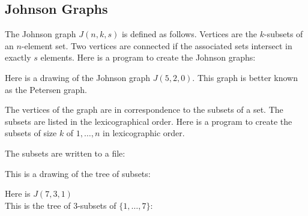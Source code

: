 \subsection{Johnson Graphs}

The Johnson graph $J(n,k,s)$ is defined as follows. Vertices are the $k$-subsets of an $n$-element set. 
Two vertices are connected if the associated sets intersect in exactly $s$ elements. 
Here is a program to create the Johnson graphs:

{\small
{\tt

}
}


Here is a drawing of the Johnson graph $J(5,2,0).$ 
This graph is better known as the Petersen graph.
$$

$$


The vertices of the graph are in correspondence to the subsets of a set. 
The subsets are 
listed in the lexicographical order. 
Here is a program to create the subsets of size $k$ of $1,\ldots,n$ 
in lexicographic order. 

{\small
{\tt

}
}
The subsets are written to a file:
{\small
{\tt

}
}
This is a drawing of the tree of subsets:
$$

$$

Here is $J(7,3,1)$
$$

$$
This is the tree of $3$-subsets of $\{1,\ldots,7\}$:
{\tiny
$$

$$
}



